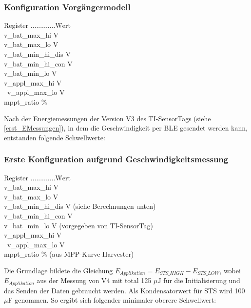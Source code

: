 \subsubsection*{Konfiguration Vorgängermodell}
\begin{tabbing}
    Register .............\quad\= Wert \\[0.8ex]
    v\_bat\_max\_hi        V \\
    v\_bat\_max\_lo        V \\
    v\_bat\_min\_hi\_dis   V \\
    v\_bat\_min\_hi\_con   V \\
    v\_bat\_min\_lo        V \\
    v\_appl\_max\_hi       V \\\
    v\_appl\_max\_lo       V \\ 
    mppt\_ratio            \thinspace\% \\
\end{tabbing}

Nach der Energiemessungen der Version V3 des TI-SensorTags (siehe \ref{erst_EMessungen}), in dem die Geschwindigkeit per BLE gesendet werden kann, entstanden folgende Schwellwerte:

\subsubsection*{Erste Konfiguration aufgrund Geschwindigkeitsmessung}
\begin{tabbing}
    Register .............\quad\= Wert \\[0.8ex]
    v\_bat\_max\_hi        V \\
    v\_bat\_max\_lo        V \\
    v\_bat\_min\_hi\_dis   V (siehe Berechnungen unten)\\
    v\_bat\_min\_hi\_con   V \\
    v\_bat\_min\_lo        V (vorgegeben von TI-SensorTag)\\
    v\_appl\_max\_hi      \> 3.8 V \\\
    v\_appl\_max\_lo       V \\ 
    mppt\_ratio            \> 50\thinspace\% (aus MPP-Kurve Harvester)\\
\end{tabbing}

Die Grundlage bildete die Gleichung  $E_{Applikation}= E_{STS\_HIGH} - E_{STS\_LOW}$, wobei  $E_{Applikation}$ aus der Messung von V4 mit total 125 $\mu$J für die Initialisierung und das Senden der Daten gebraucht werden. Als Kondensatorwert für STS wird 100 $\mu$F genommen. So ergibt sich folgender minimaler oberere Schwellwert:

